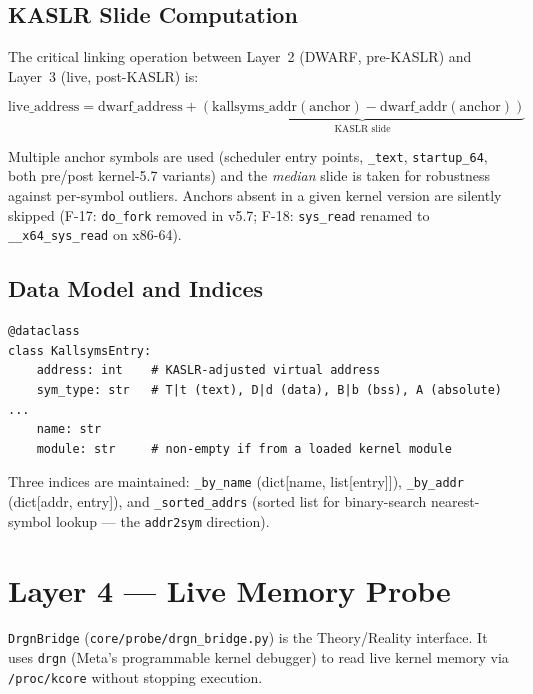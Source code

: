 \documentclass[11pt,a4paper]{article}
\newcommand{\coderef}[1]{\texttt{\small\color{layer2}#1}}
\begin{document}
\subsection{KASLR Slide Computation}

The critical linking operation between Layer~2 (DWARF, pre-KASLR) and
Layer~3 (live, post-KASLR) is:

\begin{equation}
  \text{live\_address} = \text{dwarf\_address} + \underbrace{(\text{kallsyms\_addr}(\text{anchor}) - \text{dwarf\_addr}(\text{anchor}))}_{\text{KASLR slide}}
\end{equation}

Multiple anchor symbols are used (scheduler entry points, \texttt{\_text},
\texttt{startup\_64}, both pre/post kernel-5.7 variants) and the
\emph{median} slide is taken for robustness against per-symbol outliers.
Anchors absent in a given kernel version are silently skipped
(F-17: \texttt{do\_fork} removed in v5.7; F-18: \texttt{sys\_read} renamed
to \texttt{\_\_x64\_sys\_read} on x86-64).

\subsection{Data Model and Indices}

\begin{lstlisting}
@dataclass
class KallsymsEntry:
    address: int    # KASLR-adjusted virtual address
    sym_type: str   # T|t (text), D|d (data), B|b (bss), A (absolute) ...
    name: str
    module: str     # non-empty if from a loaded kernel module
\end{lstlisting}

Three indices are maintained: \texttt{\_by\_name} (dict[name, list[entry]]),
\texttt{\_by\_addr} (dict[addr, entry]), and \texttt{\_sorted\_addrs} (sorted
list for binary-search nearest-symbol lookup --- the \texttt{addr2sym}
direction).

\section{Layer 4 --- Live Memory Probe}
\label{sec:probe}

\coderef{DrgnBridge} (\texttt{core/probe/drgn\_bridge.py}) is the
Theory/Reality interface. It uses \texttt{drgn} (Meta's programmable kernel
debugger) to read live kernel memory via \texttt{/proc/kcore} without stopping
execution.
\end{document}
